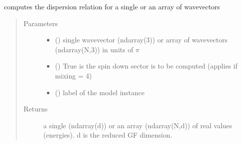 \documentclass[letterpaper,10pt,english]{sphinxmanual}
\begin{document}

\begin{fulllineitems}
\label{\detokenize{functions:pyqcm.dispersion}}
\sphinxAtStartPar
computes the dispersion relation for a single or an array of wavevectors
\begin{quote}\begin{description}
\item[{Parameters}] \leavevmode\begin{itemize}
\item {} 
\sphinxAtStartPar
{} () \textendash{} single wavevector (ndarray(3)) or array of wavevectors (ndarray(N,3)) in units of \(\pi\)

\item {} 
\sphinxAtStartPar
{} () \textendash{} True is the spin down sector is to be computed (applies if mixing = 4)

\item {} 
\sphinxAtStartPar
{} () \textendash{} label of the model instance

\end{itemize}

\item[{Returns}] \leavevmode
\sphinxAtStartPar
a single (ndarray(d)) or an array (ndarray(N,d)) of real values (energies). d is the reduced GF dimension.

\end{description}\end{quote}

\end{fulllineitems}

\end{document}
